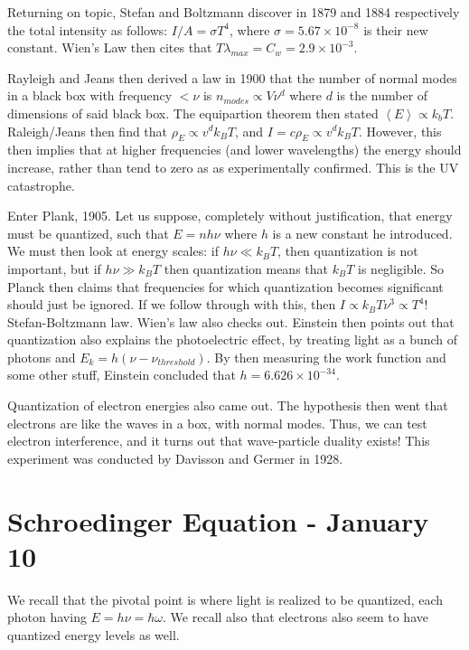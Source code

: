 \documentclass{report}
\newcommand{\scinot}[2]{#1\times 10^{#2}}
\begin{document}
Returning on topic, Stefan and Boltzmann discover in 1879 and 1884 respectively the total intensity as follows: $I/A = \sigma T^4$, where $\sigma = 5.67\times 10^{-8}$ is their new constant. Wien's Law then cites that $T\lambda_{max} = C_w = \scinot{2.9}{-3}$.

Rayleigh and Jeans then derived a law in 1900 that the number of normal modes in a black box with frequency $<\nu$ is $n_{modes} \propto V\nu^d$ where $d$ is the number of dimensions of said black box. The equipartion theorem then stated $\left<E\right> \propto k_bT$. Raleigh/Jeans then find that $\rho_E \propto v^dk_BT$, and $I = c\rho_E \propto v^dk_BT$. However, this then implies that at higher frequencies (and lower wavelengths) the energy should increase, rather than tend to zero as as experimentally confirmed. This is the UV catastrophe.

Enter Plank, 1905. Let us suppose, completely without justification, that energy must be quantized, such that $E = nh\nu$ where $h$ is a new constant he introduced. We must then look at energy scales: if $h\nu\ll k_BT$, then quantization is not important, but if $h\nu \gg k_BT$ then quantization means that $k_BT$ is negligible. So Planck then claims that frequencies for which quantization becomes significant should just be ignored. If we follow through with this, then $I \propto k_BT\nu^3 \propto T^4$! Stefan-Boltzmann law. Wien's law also checks out. Einstein then points out that quantization also explains the photoelectric effect, by treating light as a bunch of photons and $E_k = h(\nu - \nu_{threshold})$. By then measuring the work function and some other stuff, Einstein concluded that $h = \scinot{6.626}{-34}$.

Quantization of electron energies also came out. The hypothesis then went that electrons are like the waves in a box, with normal modes. Thus, we can test electron interference, and it turns out that wave-particle duality exists! This experiment was conducted by Davisson and Germer in 1928. 

\chapter{Schroedinger Equation - January 10}

We recall that the pivotal point is where light is realized to be quantized, each photon having $E = h\nu = \hbar\omega$. We recall also that electrons also seem to have quantized energy levels as well.
\end{document}
